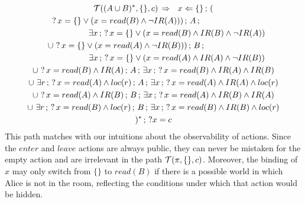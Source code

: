 \begin{multline*}
\mathcal{T}((A\cup B)^{*},\{\},c)\,\Rightarrow\,\,\,\, x\Leftarrow\{\}\,;\,(\\
?\, x=\{\}\vee(x=read(B)\wedge\neg IR(A)))\,;\, A\,;\,\,\,\,\,\,\,\,\,\,\,\,\,\,\,\,\,\,\,\,\,\,\,\,\,\,\,\,\,\,\,\,\,\,\,\,\,\,\,\,\\
\,\,\,\,\,\,\,\,\,\,\,\,\,\,\,\,\,\,\,\,\,\,\,\,\,\,\,\,\,\,\,\,\,\,\exists x\,;\,?\, x=\{\}\vee(x=read(B)\wedge IR(B)\wedge\neg IR(A))\\
\cup\,\,?\, x=\{\}\vee(x=read(A)\wedge\neg IR(B)))\,;\, B\,;\,\,\,\,\,\,\,\,\,\,\,\,\,\,\,\,\,\,\,\,\,\,\,\,\,\,\,\,\,\,\,\,\,\,\,\,\,\,\,\,\\
\,\,\,\,\,\,\,\,\,\,\,\,\,\,\,\,\,\,\,\,\,\,\,\,\,\,\,\,\,\,\,\,\,\,\exists x\,;\,?\, x=\{\}\vee(x=read(A)\wedge IR(A)\wedge\neg IR(B))\\
\cup\,\,?\, x=read(B)\wedge IR(A)\,;\, A\,;\,\exists x\,;\,?\, x=read(B)\wedge IR(A)\wedge IR(B)\\
\cup\,\,\exists r\,;\,?\, x=read(A)\wedge loc(r)\,;\, A\,;\,\exists x\,;\,?\, x=read(A)\wedge IR(A)\wedge loc(r)\\
\cup\,\,?\, x=read(A)\wedge IR(B)\,;\, B\,;\,\exists x\,;\,?\, x=read(A)\wedge IR(B)\wedge IR(A)\\
\cup\,\,\exists r\,;\,?\, x=read(B)\wedge loc(r)\,;\, B\,;\,\exists x\,;\,?\, x=read(B)\wedge IR(B)\wedge loc(r)\\
)^{*}\,;\,?x=c\end{multline*}
 This path matches with our intuitions about the observability of
actions. Since the $enter$ and $leave$ actions are always public,
they can never be mistaken for the empty action and are irrelevant
in the path $\mathcal{T}(\pi,\{\},c)$. Moreover, the binding of $x$ may
only switch from $\{\}$ to $read(B)$ if there is a possible world
in which Alice is not in the room, reflecting the conditions under
which that action would be hidden.

